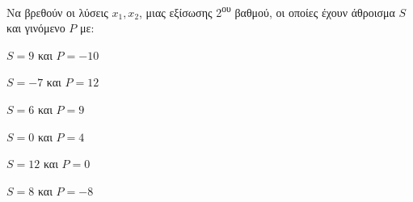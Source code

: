 Να βρεθούν οι λύσεις $ x_1, x_2 $, μιας εξίσωσης 2\textsuperscript{ου} βαθμού, οι οποίες έχουν άθροισμα $ S $ και γινόμενο $ P $ με:
\begin{multicols}{2}
\begin{alist}[leftmargin=2mm]
\item $ S=9 $ και $ P=-10 $
\item $ S=-7 $ και $ P=12 $
\item $ S=6 $ και $ P=9 $
\item $ S=0 $ και $ P=4 $
\item $ S=12 $ και $ P=0 $
\item $ S=8 $ και $ P=-8 $
\end{alist}
\end{multicols}
